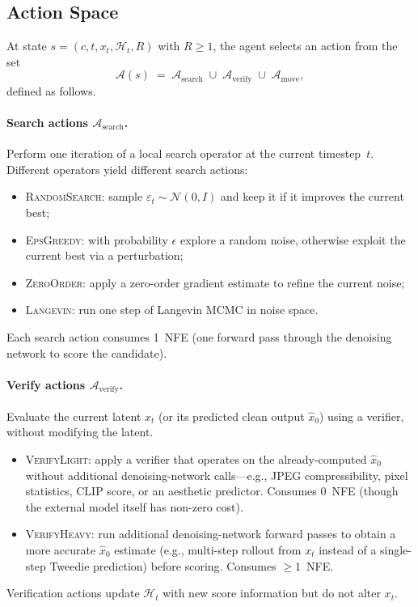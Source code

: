 \subsection{Action Space}

At state $s = (c, t, x_t, \mathcal{H}_t, R)$ with $R \ge 1$, the agent
selects an action from the set
\[
  \mathcal{A}(s) \;=\; \mathcal{A}_{\text{search}} \;\cup\;
  \mathcal{A}_{\text{verify}} \;\cup\; \mathcal{A}_{\text{move}},
\]
defined as follows.

\paragraph{Search actions $\mathcal{A}_{\text{search}}$.}
Perform one iteration of a local search operator at the current
timestep~$t$.  Different operators yield different search actions:
\begin{itemize}
  \item \textsc{RandomSearch}: sample $\varepsilon_t \sim \mathcal{N}(0,I)$
    and keep it if it improves the current best;
  \item \textsc{EpsGreedy}: with probability $\epsilon$ explore a random
    noise, otherwise exploit the current best via a perturbation;
  \item \textsc{ZeroOrder}: apply a zero-order gradient estimate to refine
    the current noise;
  \item \textsc{Langevin}: run one step of Langevin MCMC in noise space.
\end{itemize}
Each search action consumes 1~NFE (one forward pass through the
denoising network to score the candidate).

\paragraph{Verify actions $\mathcal{A}_{\text{verify}}$.}
Evaluate the current latent $x_t$ (or its predicted clean output
$\hat{x}_0$) using a verifier, without modifying the latent.
\begin{itemize}
  \item \textsc{VerifyLight}: apply a verifier that operates on the
    already-computed $\hat{x}_0$ without additional denoising-network
    calls---e.g., JPEG compressibility, pixel statistics, CLIP score,
    or an aesthetic predictor.  Consumes 0~NFE (though the external
    model itself has non-zero cost).
  \item \textsc{VerifyHeavy}: run additional denoising-network
    forward passes to obtain a more accurate $\hat{x}_0$ estimate
    (e.g., multi-step rollout from $x_t$ instead of a single-step
    Tweedie prediction) before scoring.  Consumes $\ge 1$~NFE.
\end{itemize}
Verification actions update $\mathcal{H}_t$ with new score information
but do not alter $x_t$.


